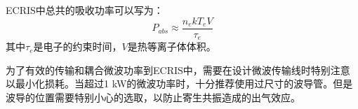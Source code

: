 \documentclass[fontset=windows]{article}
\begin{document}
ECRIS中总共的吸收功率可以写为：
\begin{equation}
    P_{abs}\approx\frac{n_ekT_eV}{\tau_e}
\end{equation}
其中$\tau_e$是电子的约束时间，$V$是热等离子体体积。

为了有效的传输和耦合微波功率到ECRIS中，需要在设计微波传输线时特别注意以最小化损耗。当超过1 kW的微波功率时，十分推荐使用过尺寸的波导管。但是波导的位置需要特别小心的选取，以防止寄生共振造成的出气效应。



\end{document}
